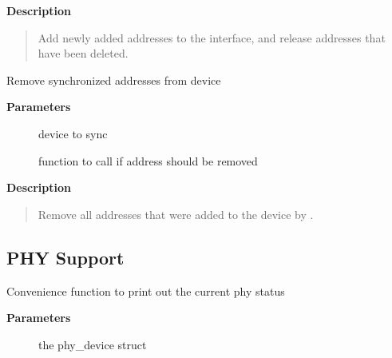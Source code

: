 \documentclass[a4paper,8pt,english]{sphinxmanual}
\begin{document}
\textbf{Description}
\begin{quote}

Add newly added addresses to the interface, and release
addresses that have been deleted.
\end{quote}

\begin{fulllineitems}
\label{networking/kapi:c.__dev_mc_unsync}
Remove synchronized addresses from device

\end{fulllineitems}


\textbf{Parameters}
\begin{description}
\item[{}] \leavevmode
device to sync

\item[{}] \leavevmode
function to call if address should be removed

\end{description}

\textbf{Description}
\begin{quote}

Remove all addresses that were added to the device by .
\end{quote}


\subsection{PHY Support}
\label{networking/kapi:phy-support}

\begin{fulllineitems}
\label{networking/kapi:c.phy_print_status}
Convenience function to print out the current phy status

\end{fulllineitems}


\textbf{Parameters}
\begin{description}
\item[{}] \leavevmode
the phy\_device struct

\end{description}
\end{document}
